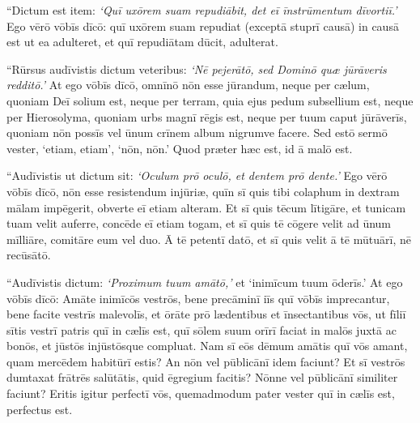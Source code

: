 \Versus ``Dictum est item: \emph{`Quī uxōrem suam repudiābit, det eī īnstrūmentum dīvortiī.'}
\Versus Ego vērō vōbīs dīcō: quī uxōrem suam repudiat (exceptā stuprī causā) in causā est ut ea adulteret, et quī repudiātam dūcit, adulterat.

\Versus ``Rūrsus audīvistis dictum veteribus: \emph{`Nē pejerātō, sed Dominō quæ jūrāveris redditō.'}
\Versus At ego vōbīs dīcō, omnīnō nōn esse jūrandum, neque per cælum, quoniam Deī solium est,
\Versus neque per terram, quia ejus pedum subsellium est, neque per Hierosolyma, quoniam urbs magnī rēgis est,
\Versus neque per tuum caput jūrāverīs, quoniam nōn possīs vel ūnum crīnem album nigrumve facere.
\Versus Sed estō sermō vester, `etiam, etiam', `nōn, nōn.' Quod præter hæc est, id ā malō est.

\Versus ``Audīvistis ut dictum sit: \emph{`Oculum prō oculō, et dentem prō dente.'} 
\Versus Ego vērō vōbīs dīcō, nōn esse resistendum injūriæ, quīn sī quis tibi colaphum in dextram mālam impēgerit, obverte eī etiam alteram.
\Versus Et sī quis tēcum lītigāre, et tunicam tuam velit auferre, concēde eī etiam togam,
\Versus et sī quis tē cōgere velit ad ūnum mīlliāre, comitāre eum vel duo.
\Versus Ā tē petentī datō, et sī quis velit ā tē mūtuārī, nē recūsātō.

\Versus ``Audīvistis dictum: \emph{`Proximum tuum amātō,'} et `inimīcum tuum ōderīs.'
\Versus At ego vōbīs dīcō: Amāte inimīcōs vestrōs, bene precāminī iīs quī vōbīs imprecantur, bene facite vestrīs malevolīs, et ōrāte prō lædentibus et īnsectantibus vōs,
\Versus ut fīliī sītis vestrī patris quī in cælīs est, quī sōlem suum orīrī faciat in malōs juxtā ac bonōs, et jūstōs injūstōsque compluat. 
\Versus Nam sī eōs dēmum amātis quī vōs amant, quam mercēdem habitūrī estis? An nōn vel pūblicānī idem faciunt? 
\Versus Et sī vestrōs dumtaxat frātrēs salūtātis, quid ēgregium facitis? Nōnne vel pūblicānī similiter faciunt? 
\Versus Eritis igitur perfectī vōs, quemadmodum pater vester quī in cælīs est, perfectus est. 



